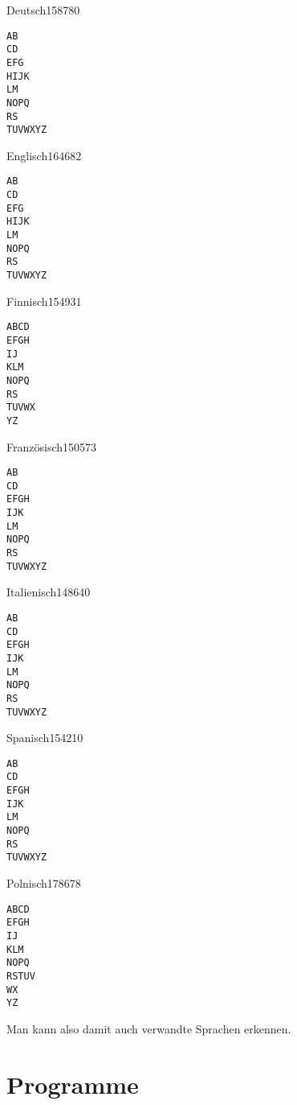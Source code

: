 \documentclass[11pt,a4paper]{article}
\begin{document}
\begin{lansol}{Deutsch}{158780}
\begin{verbatim}
AB
CD
EFG
HIJK
LM
NOPQ
RS
TUVWXYZ
\end{verbatim}
\end{lansol}
\begin{lansol}{Englisch}{164682}
\begin{verbatim}
AB
CD
EFG
HIJK
LM
NOPQ
RS
TUVWXYZ
\end{verbatim}
\end{lansol}
\begin{lansol}{Finnisch}{154931}
\begin{verbatim}
ABCD
EFGH
IJ
KLM
NOPQ
RS
TUVWX
YZ
\end{verbatim}
\end{lansol}
\begin{lansol}{Französisch}{150573}
\begin{verbatim}
AB
CD
EFGH
IJK
LM
NOPQ
RS
TUVWXYZ
\end{verbatim}
\end{lansol}
\begin{lansol}{Italienisch}{148640}
\begin{verbatim}
AB
CD
EFGH
IJK
LM
NOPQ
RS
TUVWXYZ
\end{verbatim}
\end{lansol}
\begin{lansol}{Spanisch}{154210}
\begin{verbatim}
AB
CD
EFGH
IJK
LM
NOPQ
RS
TUVWXYZ
\end{verbatim}
\end{lansol}
\begin{lansol}{Polnisch}{178678}
\begin{verbatim}
ABCD
EFGH
IJ
KLM
NOPQ
RSTUV
WX
YZ
\end{verbatim}
\end{lansol}

Man kann also damit auch verwandte Sprachen erkennen.

\section{Programme}
\end{document}
